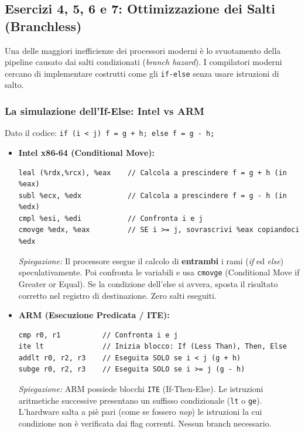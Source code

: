 \documentclass[12pt, a4paper]{article}
\begin{document}
\subsection{Esercizi 4, 5, 6 e 7: Ottimizzazione dei Salti (Branchless)}
Una delle maggiori inefficienze dei processori moderni è lo svuotamento della pipeline causato dai salti condizionati (\textit{branch hazard}). I compilatori moderni cercano di implementare costrutti come gli \texttt{if-else} senza usare istruzioni di salto.

\subsubsection{La simulazione dell'If-Else: Intel vs ARM}
Dato il codice: \texttt{if (i < j) f = g + h; else f = g - h;}

\begin{itemize}
    \item \textbf{Intel x86-64 (Conditional Move):} 
\begin{verbatim}
leal (%rdx,%rcx), %eax    // Calcola a prescindere f = g + h (in %eax)
subl %ecx, %edx           // Calcola a prescindere f = g - h (in %edx)
cmpl %esi, %edi           // Confronta i e j
cmovge %edx, %eax         // SE i >= j, sovrascrivi %eax copiandoci %edx
\end{verbatim}
    \textit{Spiegazione:} Il processore esegue il calcolo di \textbf{entrambi} i rami (\textit{if} ed \textit{else}) speculativamente. Poi confronta le variabili e usa \texttt{cmovge} (Conditional Move if Greater or Equal). Se la condizione dell'else si avvera, sposta il risultato corretto nel registro di destinazione. Zero salti eseguiti.

    \item \textbf{ARM (Esecuzione Predicata / ITE):}
\begin{verbatim}
cmp r0, r1          // Confronta i e j
ite lt              // Inizia blocco: If (Less Than), Then, Else
addlt r0, r2, r3    // Eseguita SOLO se i < j (g + h)
subge r0, r2, r3    // Eseguita SOLO se i >= j (g - h)
\end{verbatim}
    \textit{Spiegazione:} ARM possiede blocchi \texttt{ITE} (If-Then-Else). Le istruzioni aritmetiche successive presentano un suffisso condizionale (\texttt{lt} o \texttt{ge}). L'hardware salta a piè pari (come se fossero \textit{nop}) le istruzioni la cui condizione non è verificata dai flag correnti. Nessun branch necessario.
\end{itemize}
\end{document}

